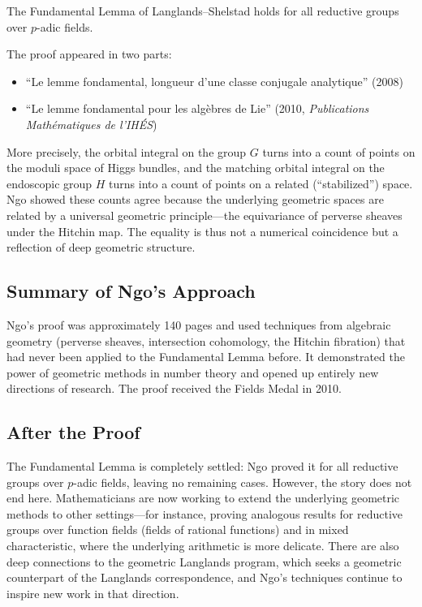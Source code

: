 \begin{theorem}
The Fundamental Lemma of Langlands--Shelstad holds for all reductive groups over $p$-adic fields.
\end{theorem}

The proof appeared in two parts:
\begin{itemize}
\item ``Le lemme fondamental, longueur d'une classe conjugale analytique'' (2008)
\item ``Le lemme fondamental pour les alg\`ebres de Lie'' (2010, \emph{Publications Math\'ematiques de l'IH\'ES})
\end{itemize}

More precisely, the orbital integral on the group $G$ turns into a count of points on the moduli space of Higgs bundles, and the matching orbital integral on the endoscopic group $H$ turns into a count of points on a related (``stabilized'') space. Ngo showed these counts agree because the underlying geometric spaces are related by a universal geometric principle---the equivariance of perverse sheaves under the Hitchin map. The equality is thus not a numerical coincidence but a reflection of deep geometric structure.

\subsection{Summary of Ngo's Approach}

\begin{highlightbox}
Ngo's proof was approximately 140 pages and used techniques from algebraic geometry (perverse sheaves, intersection cohomology, the Hitchin fibration) that had never been applied to the Fundamental Lemma before. It demonstrated the power of geometric methods in number theory and opened up entirely new directions of research. The proof received the Fields Medal in 2010.
\end{highlightbox}

\subsection{After the Proof}

The Fundamental Lemma is completely settled: Ngo proved it for all reductive groups over $p$-adic fields, leaving no remaining cases. However, the story does not end here. Mathematicians are now working to extend the underlying geometric methods to other settings---for instance, proving analogous results for reductive groups over function fields (fields of rational functions) and in mixed characteristic, where the underlying arithmetic is more delicate. There are also deep connections to the geometric Langlands program, which seeks a geometric counterpart of the Langlands correspondence, and Ngo's techniques continue to inspire new work in that direction.

